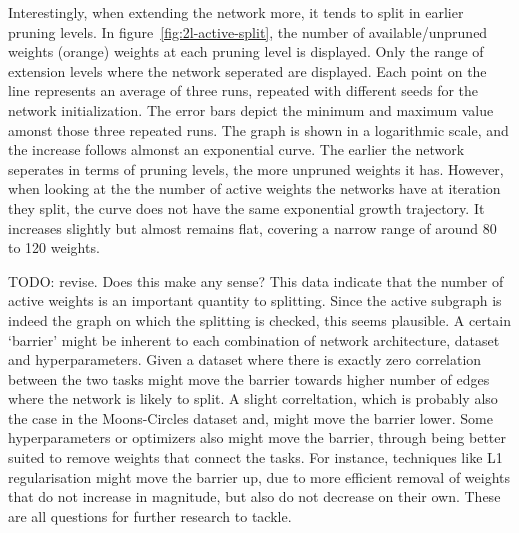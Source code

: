 Interestingly, when extending the network more, it tends to split in earlier pruning levels.
In figure~\ref{fig:2l-active-split}, the number of available/unpruned weights (orange) weights at each pruning level is displayed.
Only the range of extension levels where the network seperated are displayed.
Each point on the line represents an average of three runs, repeated with different seeds for the network initialization.
The error bars depict the minimum and maximum value amonst those three repeated runs.
The graph is shown in a logarithmic scale, and the increase follows almonst an exponential curve.
The earlier the network seperates in terms of pruning levels, the more unpruned weights it has.
However, when looking at the the number of active weights the networks have at iteration they split, the curve does not have the same exponential growth trajectory.
It increases slightly but almost remains flat, covering a narrow range of around 80 to 120 weights.

TODO: revise. Does this make any sense?
This data indicate that the number of active weights is an important quantity to splitting.
Since the active subgraph is indeed the graph on which the splitting is checked, this seems plausible.
A certain `barrier' might be inherent to each combination of network architecture, dataset and hyperparameters.
Given a dataset where there is exactly zero correlation between the two tasks might move the barrier towards higher number of edges where the network is likely to split.
A slight correltation, which is probably also the case in the Moons-Circles dataset and, might move the barrier lower.
Some hyperparameters or optimizers also might move the barrier, through being better suited to remove weights that connect the tasks.
For instance, techniques like L1 regularisation might move the barrier up, due to more efficient removal of weights that do not increase in magnitude, but also do not decrease on their own.
These are all questions for further research to tackle.
 
